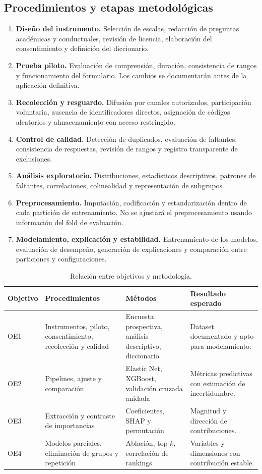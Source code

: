 \documentclass[11pt,a4paper]{article}
\begin{document}
\subsection{Procedimientos y etapas metodológicas}

\begin{enumerate}
  \item \textbf{Diseño del instrumento.} Selección de escalas, redacción de preguntas académicas y conductuales, revisión de licencia, elaboración del consentimiento y definición del diccionario.
  \item \textbf{Prueba piloto.} Evaluación de comprensión, duración, consistencia de rangos y funcionamiento del formulario. Los cambios se documentarán antes de la aplicación definitiva.
  \item \textbf{Recolección y resguardo.} Difusión por canales autorizados, participación voluntaria, ausencia de identificadores directos, asignación de códigos aleatorios y almacenamiento con acceso restringido.
  \item \textbf{Control de calidad.} Detección de duplicados, evaluación de faltantes, consistencia de respuestas, revisión de rangos y registro transparente de exclusiones.
  \item \textbf{Análisis exploratorio.} Distribuciones, estadísticos descriptivos, patrones de faltantes, correlaciones, colinealidad y representación de subgrupos.
  \item \textbf{Preprocesamiento.} Imputación, codificación y estandarización dentro de cada partición de entrenamiento. No se ajustará el preprocesamiento usando información del fold de evaluación.
  \item \textbf{Modelamiento, explicación y estabilidad.} Entrenamiento de los modelos, evaluación de desempeño, generación de explicaciones y comparación entre particiones y configuraciones.
\end{enumerate}

\begin{table}[H]
\centering
\scriptsize
\caption{Relación entre objetivos y metodología.}
\begin{tabularx}{\textwidth}{p{1.25cm}p{3.25cm}p{3.15cm}X}
\toprule
Objetivo & Procedimientos & Métodos & Resultado esperado \\
\midrule
OE1 & Instrumentos, piloto, consentimiento, recolección y calidad & Encuesta prospectiva, análisis descriptivo, diccionario & Dataset documentado y apto para modelamiento. \\
OE2 & Pipelines, ajuste y comparación & Elastic Net, XGBoost, validación cruzada anidada & Métricas predictivas con estimación de incertidumbre. \\
OE3 & Extracción y contraste de importancias & Coeficientes, SHAP y permutación & Magnitud y dirección de contribuciones. \\
OE4 & Modelos parciales, eliminación de grupos y repetición & Ablación, top-$k$, correlación de rankings & Variables y dimensiones con contribución estable. \\
\bottomrule
\end{tabularx}
\end{table}
\end{document}
